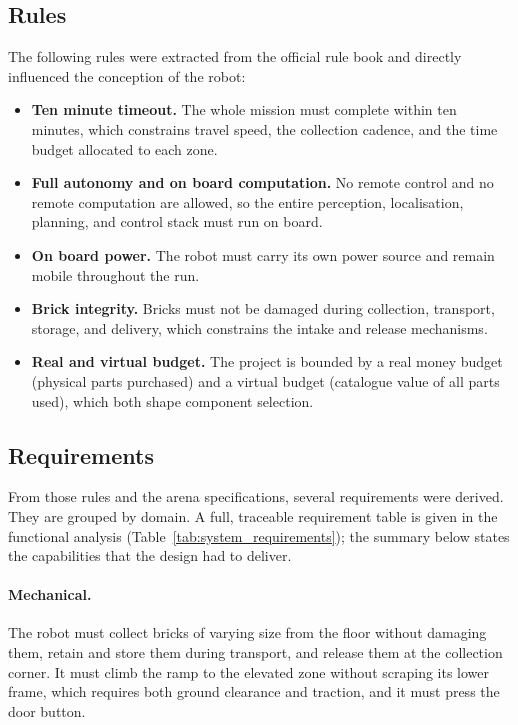 \documentclass[11pt]{article}
\begin{document}
\subsection{Rules}
The following rules were extracted from the official rule book and directly influenced the conception of the robot:
\begin{itemize}[noitemsep]
    \item \textbf{Ten minute timeout.} The whole mission must complete within ten minutes, which constrains travel speed, the collection cadence, and the time budget allocated to each zone.
    \item \textbf{Full autonomy and on board computation.} No remote control and no remote computation are allowed, so the entire perception, localisation, planning, and control stack must run on board.
    \item \textbf{On board power.} The robot must carry its own power source and remain mobile throughout the run.
    \item \textbf{Brick integrity.} Bricks must not be damaged during collection, transport, storage, and delivery, which constrains the intake and release mechanisms.
    \item \textbf{Real and virtual budget.} The project is bounded by a real money budget (physical parts purchased) and a virtual budget (catalogue value of all parts used), which both shape component selection.
\end{itemize}

\subsection{Requirements}
From those rules and the arena specifications, several requirements were derived. They are grouped by domain. A full, traceable requirement table is given in the functional analysis (Table~\ref{tab:system_requirements}); the summary below states the capabilities that the design had to deliver.

\paragraph{Mechanical.} The robot must collect bricks of varying size from the floor without damaging them, retain and store them during transport, and release them at the collection corner. It must climb the ramp to the elevated zone without scraping its lower frame, which requires both ground clearance and traction, and it must press the door button.
\end{document}
